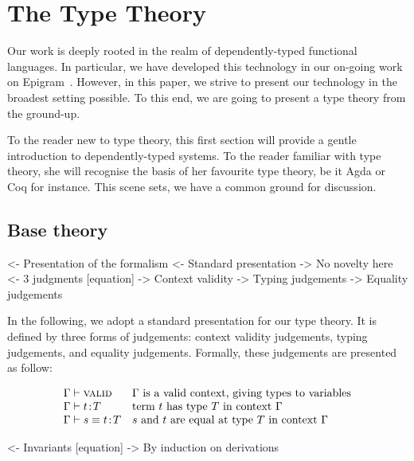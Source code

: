 \section{The Type Theory}

Our work is deeply rooted in the realm of dependently-typed functional
languages. In particular, we have developed this technology in our
on-going work on Epigram~\cite{pigs:epigram}. However, in this paper,
we strive to present our technology in the broadest setting
possible. To this end, we are going to present a type theory from the
ground-up.

To the reader new to type theory, this first section will provide a
gentle introduction to dependently-typed systems. To the reader
familiar with type theory, she will recognise the basis of her
favourite type theory, be it Agda or Coq for instance. This scene sets,
we have a common ground for discussion.

\subsection{Base theory}

\begin{wstructure}
<- Presentation of the formalism
    <- Standard presentation
        -> No novelty here
    <- 3 judgments [equation]
        -> Context validity
        -> Typing judgements
        -> Equality judgements
\end{wstructure}

In the following, we adopt a standard presentation for our type
theory. It is defined by three forms of judgements: context validity
judgements, typing judgements, and equality judgements. Formally,
these judgements are presented as follow:

\[
\begin{array}{ll}
\Gamma \vdash \textsc{valid}                & \mbox{\(\Gamma\) is a valid context, giving types to variables} \\
\Gamma \vdash t\!:\!T           & \mbox{term \(t\) has type \(T\) in context \(\Gamma\)} \\
\Gamma \vdash s \equiv t\!:\!T  & \mbox{\(s\) and \(t\) are equal at type \(T\) in context \(\Gamma\)} \\
\end{array}
\]

\begin{wstructure}
    <- Invariants [equation]
        -> By induction on derivations
\end{wstructure}

